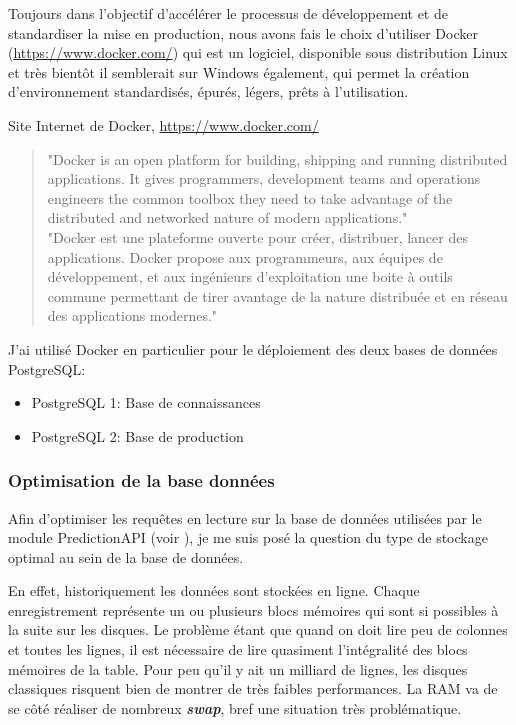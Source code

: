 Toujours dans l'objectif d'accélérer le processus de développement et de standardiser la mise en production, nous avons fais le choix d'utiliser Docker (\url{https://www.docker.com/}) qui est un logiciel, disponible sous distribution Linux et très bientôt il semblerait sur Windows également, qui permet la création d'environnement standardisés, épurés, légers, prêts à l'utilisation.


\begin{chapquote}
{Site Internet de Docker, \url{https://www.docker.com/}}
\begin{verse}
"Docker is an open platform for building, shipping and running distributed applications. It gives programmers, development teams and operations engineers the common toolbox they need to take advantage of the distributed and networked nature of modern applications."\\
\vspace{3mm}
"Docker est une plateforme ouverte pour créer, distribuer, lancer des applications. Docker propose aux programmeurs, aux équipes de développement, et aux ingénieurs d'exploitation une boite à outils commune permettant de tirer avantage de la nature distribuée et en réseau des applications modernes."
\end{verse}
\end{chapquote}

J'ai utilisé Docker en particulier pour le déploiement des deux bases de données PostgreSQL:
\begin{itemize}
	\item PostgreSQL 1: Base de connaissances
	\item PostgreSQL 2: Base de production
\end{itemize}
\vspace{3mm}

\subsubsection{Optimisation de la base données}

Afin d'optimiser les requêtes en lecture sur la base de données utilisées par le module PredictionAPI (voir ), je me suis posé la question du type de stockage optimal au sein de la base de données.

En effet, historiquement les données sont stockées en ligne. Chaque enregistrement représente un ou plusieurs blocs mémoires qui sont si possibles à la suite sur les disques. Le problème étant que quand on doit lire peu de colonnes et toutes les lignes, il est nécessaire de lire quasiment l'intégralité des blocs mémoires de la table. Pour peu qu'il y ait un milliard de lignes, les disques classiques risquent bien de montrer de très faibles performances. La RAM va de se côté réaliser de nombreux \textbf{\textit{swap}}, bref une situation très problématique.

